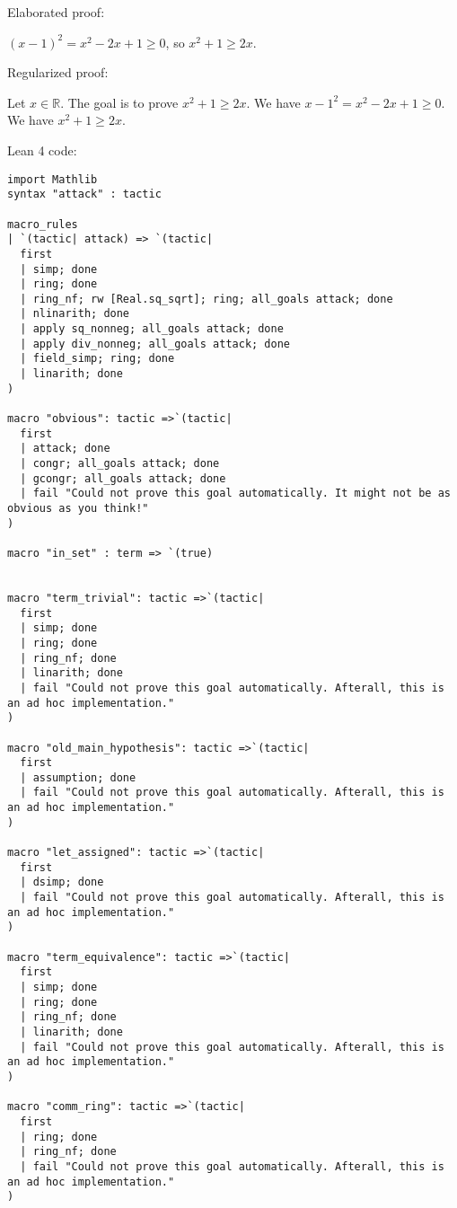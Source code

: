 \documentclass{article}
\begin{document}
Elaborated proof:
\begin{tcolorbox}[colback=green!10, width=\linewidth]
$(x-1)^2 = x^2 - 2x + 1 \ge 0$, so $x^2 + 1 \ge 2x$.
\end{tcolorbox}

Regularized proof:
\begin{tcolorbox}[colback=red!10, width=\linewidth]
Let $x\in\mathbb{R}$.
The goal is to prove $x^2 + 1 \ge 2x$.
We have ${{x-1}}^2 = x^2 - 2x + 1 \ge 0$.
We have $x^2 + 1 \ge 2x$.
\end{tcolorbox}

Lean 4 code:
\begin{tcolorbox}[colback=white!10, width=\linewidth]
\begin{lstlisting}[language=Lean4]
import Mathlib
syntax "attack" : tactic

macro_rules
| `(tactic| attack) => `(tactic|
  first
  | simp; done
  | ring; done
  | ring_nf; rw [Real.sq_sqrt]; ring; all_goals attack; done
  | nlinarith; done
  | apply sq_nonneg; all_goals attack; done
  | apply div_nonneg; all_goals attack; done
  | field_simp; ring; done
  | linarith; done
)

macro "obvious": tactic =>`(tactic|
  first
  | attack; done
  | congr; all_goals attack; done
  | gcongr; all_goals attack; done
  | fail "Could not prove this goal automatically. It might not be as obvious as you think!"
)

macro "in_set" : term => `(true)


macro "term_trivial": tactic =>`(tactic|
  first
  | simp; done
  | ring; done
  | ring_nf; done
  | linarith; done
  | fail "Could not prove this goal automatically. Afterall, this is an ad hoc implementation."
)

macro "old_main_hypothesis": tactic =>`(tactic|
  first
  | assumption; done
  | fail "Could not prove this goal automatically. Afterall, this is an ad hoc implementation."
)

macro "let_assigned": tactic =>`(tactic|
  first
  | dsimp; done
  | fail "Could not prove this goal automatically. Afterall, this is an ad hoc implementation."
)

macro "term_equivalence": tactic =>`(tactic|
  first
  | simp; done
  | ring; done
  | ring_nf; done
  | linarith; done
  | fail "Could not prove this goal automatically. Afterall, this is an ad hoc implementation."
)

macro "comm_ring": tactic =>`(tactic|
  first
  | ring; done
  | ring_nf; done
  | fail "Could not prove this goal automatically. Afterall, this is an ad hoc implementation."
)


\end{lstlisting}
\end{tcolorbox}
\end{document}
